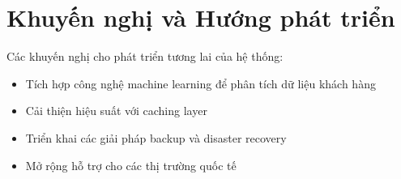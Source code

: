 \chapter{Khuyến nghị và Hướng phát triển}

Các khuyến nghị cho phát triển tương lai của hệ thống:
\begin{itemize}
  \item Tích hợp công nghệ machine learning để phân tích dữ liệu khách hàng
  \item Cải thiện hiệu suất với caching layer
  \item Triển khai các giải pháp backup và disaster recovery
  \item Mở rộng hỗ trợ cho các thị trường quốc tế
\end{itemize}